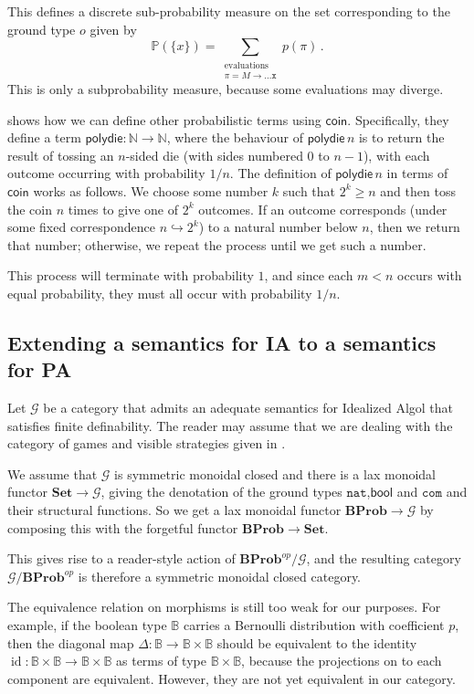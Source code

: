 \documentclass{svproc}
\newcommand\G{\mathcal{G}}
\DeclareMathOperator\id{id}
\newcommand{\nat}{{\mathtt{nat}}}
\newcommand*\from{\colon}
\newcommand{\x}{{\mathtt{x}}}
\newcommand{\0}{{\mathtt{0}}} \newcommand{\com}{{\mathtt{com}}}
\newcommand{\catname}[1]{\mathbf{#1}}
\newcommand{\Set}{\catname{Set}}
\newcommand{\BProb}{\catname{BProb}}
\newcommand{\bN}{\mathbb{N}}
\newcommand{\bB}{\mathbb{B}}
\newcommand{\bP}{\mathbb{P}}
\newcommand{\coin}{\textsf{coin}}
\newcommand{\polydie}{\textsf{polydie}}
\newcommand{\bool}{\textsf{bool}}
\begin{document}
This defines a discrete sub-probability measure on the set corresponding to the ground type $o$ given by
\[
  \bP(\{x\}) = \sum_{\substack{\text{evaluations}\\\pi = M \to\dots \x}}p(\pi)\,.
  \]
This is only a subprobability measure, because some evaluations may diverge.

\cite{DanosHarmer} shows how we can define other probabilistic terms using $\coin$.  
Specifically, they define a term $\polydie\from\bN\to\bN$, where the behaviour of $\polydie\,n$ is to return the result of tossing an $n$-sided die (with sides numbered $0$ to $n-1$), with each outcome occurring with probability $1/n$.  
The definition of $\polydie\,n$ in terms of $\coin$ works as follows.  
We choose some number $k$ such that $2^k\ge n$ and then toss the coin $n$ times to give one of $2^k$ outcomes.  
If an outcome corresponds (under some fixed correspondence $n\hookrightarrow 2^k$) to a natural number below $n$, then we return that number; otherwise, we repeat the process until we get such a number.  

This process will terminate with probability $1$, and since each $m<n$ occurs with equal probability, they must all occur with probability $1/n$.

\subsection{Extending a semantics for IA to a semantics for PA}

Let $\G$ be a category that admits an adequate semantics for Idealized Algol that satisfies finite definability.
The reader may assume that we are dealing with the category of games and visible strategies given in \cite{SamsonGuyIAPassive}.

We assume that $\G$ is symmetric monoidal closed and there is a lax monoidal functor $\Set\to \G$, giving the denotation of the ground types $\nat$,$\bool$ and $\com$ and their structural functions.
So we get a lax monoidal functor $\BProb \to \G$ by composing this with the forgetful functor $\BProb\to\Set$.

This gives rise to a reader-style action of $\BProb^{op}/\G$, and the resulting category $\G/\BProb^{op}$ is therefore a symmetric monoidal closed category.  

The equivalence relation on morphisms is still too weak for our purposes.  
For example, if the boolean type $\bB$ carries a Bernoulli distribution with coefficient $p$, then the diagonal map $\Delta\from \bB\to \bB\times\bB$ should be equivalent to the identity $\id\from\bB\times\bB\to\bB\times\bB$ as terms of type $\bB\times\bB$, because the projections on to each component are equivalent.  
However, they are not yet equivalent in our category.  
\end{document}

